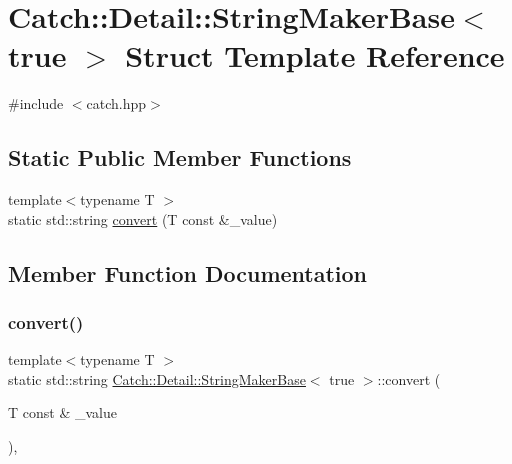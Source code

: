 \hypertarget{struct_catch_1_1_detail_1_1_string_maker_base_3_01true_01_4}{}\section{Catch\+:\+:Detail\+:\+:String\+Maker\+Base$<$ true $>$ Struct Template Reference}
\label{struct_catch_1_1_detail_1_1_string_maker_base_3_01true_01_4}


{\ttfamily \#include $<$catch.\+hpp$>$}

\subsection*{Static Public Member Functions}
\begin{DoxyCompactItemize}
\item 
{\footnotesize template$<$typename T $>$ }\\static std\+::string \hyperlink{struct_catch_1_1_detail_1_1_string_maker_base_3_01true_01_4_af9b5fdf7fddd8c5c873caa819e5f00f6}{convert} (T const \&\+\_\+value)
\end{DoxyCompactItemize}


\subsection{Member Function Documentation}
\hypertarget{struct_catch_1_1_detail_1_1_string_maker_base_3_01true_01_4_af9b5fdf7fddd8c5c873caa819e5f00f6}{}\label{struct_catch_1_1_detail_1_1_string_maker_base_3_01true_01_4_af9b5fdf7fddd8c5c873caa819e5f00f6} 
\subsubsection{\texorpdfstring{convert()}{convert()}}
{\footnotesize\ttfamily template$<$typename T $>$ \\
static std\+::string \hyperlink{struct_catch_1_1_detail_1_1_string_maker_base}{Catch\+::\+Detail\+::\+String\+Maker\+Base}$<$ true $>$\+::convert (\begin{DoxyParamCaption}\item[{T const \&}]{\+\_\+value }\end{DoxyParamCaption})\hspace{0.3cm}{\ttfamily [inline]}, {\ttfamily [static]}}

